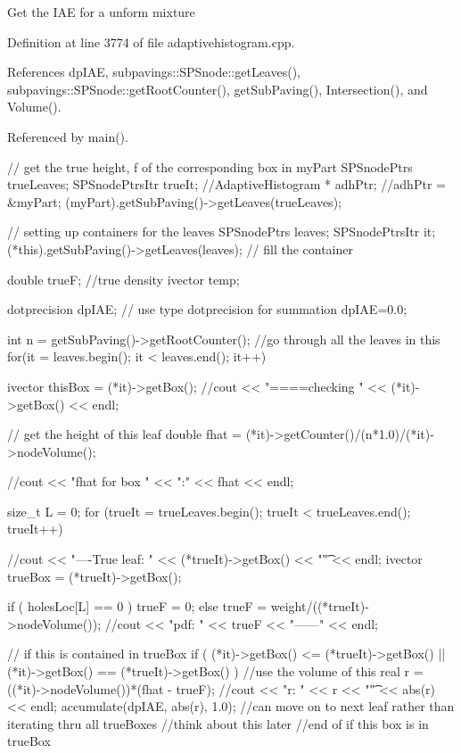 \-Get the \-I\-A\-E for a unform mixture 

\-Definition at line 3774 of file adaptivehistogram.\-cpp.



\-References dp\-I\-A\-E, subpavings\-::\-S\-P\-Snode\-::get\-Leaves(), subpavings\-::\-S\-P\-Snode\-::get\-Root\-Counter(), get\-Sub\-Paving(), \-Intersection(), and \-Volume().



\-Referenced by main().


\begin{DoxyCode}
{
   // get the true height, f of the corresponding box in myPart
  SPSnodePtrs trueLeaves;
  SPSnodePtrsItr trueIt;
  //AdaptiveHistogram * adhPtr;
  //adhPtr = &myPart;
  (myPart).getSubPaving()->getLeaves(trueLeaves);

  // setting up containers for the leaves
  SPSnodePtrs leaves;
  SPSnodePtrsItr it;
  (*this).getSubPaving()->getLeaves(leaves); // fill the container

  double trueF; //true density
  ivector temp;
  
  dotprecision dpIAE;    // use type dotprecision for summation  
  dpIAE=0.0;

  int n = getSubPaving()->getRootCounter();
  //go through all the leaves in this
  for(it = leaves.begin(); it < leaves.end(); it++) {
    ivector thisBox = (*it)->getBox();
    //cout << "====checking " << (*it)->getBox() << endl;
      
    // get the height of this leaf
    double fhat = (*it)->getCounter()/(n*1.0)/(*it)->nodeVolume(); 
    
    //cout << "fhat for box " << ":" << fhat << endl;

    size_t L = 0;
    for (trueIt = trueLeaves.begin(); trueIt < trueLeaves.end(); trueIt++) {
      //cout << "----True leaf: " << (*trueIt)->getBox() << "\t" << endl;
      ivector trueBox = (*trueIt)->getBox();

      if (  holesLoc[L] == 0 ) { trueF = 0; }
      else { trueF = weight/((*trueIt)->nodeVolume()); }
      //cout << "pdf: " << trueF << "------" << endl;
      
      // if this is contained in trueBox
      if ( (*it)->getBox() <= (*trueIt)->getBox() || (*it)->getBox() == 
      (*trueIt)->getBox() ) {
        //use the volume of this
        real r = ((*it)->nodeVolume())*(fhat - trueF);
        //cout << "r: " << r << "\t" << abs(r) << endl;
        accumulate(dpIAE, abs(r), 1.0);
        //can move on to next leaf rather than iterating thru all trueBoxes
        //think about this later
      } //end of if this box is in trueBox
      
}}}
\end{DoxyCode}
